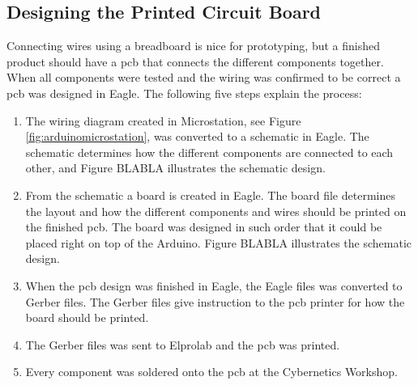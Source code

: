 \subsection{Designing the Printed Circuit Board}
Connecting wires using a breadboard is nice for prototyping, but a finished product should have a \acrshort{pcb} that connects the different components together. When all components were tested and the wiring was confirmed to be correct a \acrshort{pcb} was designed in Eagle. The following five steps explain the process:
\begin{enumerate}[1.]
\item The wiring diagram created in Microstation, see Figure \ref{fig:arduinomicrostation}, was converted to a schematic in Eagle. The schematic determines how the different components are connected to each other, and Figure BLABLA illustrates the schematic design. 
\item From the schematic a board is created in Eagle. The board file determines the layout and how the different components and wires should be printed on the finished \acrshort{pcb}. The board was designed in such order that it could be placed right on top of the Arduino. Figure BLABLA illustrates the schematic design. 
\item When the \acrshort{pcb} design was finished in Eagle, the Eagle files was converted to Gerber files. The Gerber files give instruction to the \acrshort{pcb} printer for how the board should be printed.
\item The Gerber files was sent to Elprolab and the \acrshort{pcb} was printed.
\item Every component was soldered onto the \acrshort{pcb} at the Cybernetics Workshop.
\end{enumerate}